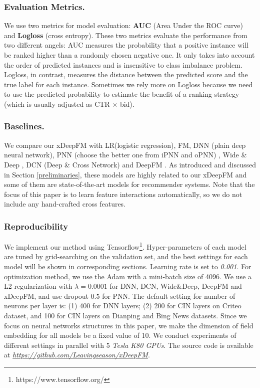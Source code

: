 \subsubsection{Evaluation Metrics.} We use two metrics for model evaluation: \textbf{AUC} (Area Under the ROC curve) and \textbf{Logloss} (cross entropy). These two metrics evaluate the performance from two different angels: AUC measures the probability that a positive instance will be ranked higher than a randomly chosen negative one. It only takes into account the order of predicted instances and is insensitive to class imbalance problem. Logloss, in contrast, measures the distance between the predicted score and the true label for each instance. Sometimes we rely more on Logloss because we need to use the predicted probability to estimate the benefit of a ranking strategy (which is usually adjusted as CTR $\times$ bid).
\subsubsection{Baselines.} We compare our xDeepFM with LR(logistic regression), FM, DNN (plain deep neural network), PNN (choose the better one from iPNN and oPNN) \cite{qu2016product}, Wide \& Deep \cite{cheng2016wide}, DCN (Deep \& Cross Network) \cite{wang2017deep} and DeepFM \cite{guo2017deepfm}. As introduced and discussed in Section \ref{preliminaries}, these models are highly related to our xDeepFM and some of them are state-of-the-art models for recommender systems. Note that the focus of this paper is to learn feature interactions automatically, so we do not include any hand-crafted cross features.  
\subsubsection{Reproducibility} We implement our method using Tensorflow\footnote{https://www.tensorflow.org/}. Hyper-parameters of each model are tuned by grid-searching on the validation set, and the best settings for each model will be shown in corresponding sections. Learning rate is set to \textsl{0.001}. For optimization method, we use the Adam \cite{kingma2014adam} with a mini-batch size of 4096. We use a L2 regularization with $\lambda=0.0001$ for DNN, DCN, Wide\&Deep, DeepFM and xDeepFM, and use dropout 0.5 for PNN. The default setting for number of neurons per layer is: (1) 400 for DNN layers; (2) 200 for CIN layers on Criteo dataset, and 100 for CIN layers on Dianping and Bing News datasets. Since we focus on neural networks structures in this paper, we make the dimension of field embedding for all models be a fixed value of 10. We conduct experiments of different settings in parallel with 5 \textsl{Tesla K80 GPUs}.
The source code is available at \textsl{\url{https://github.com/Leavingseason/xDeepFM}}. 

